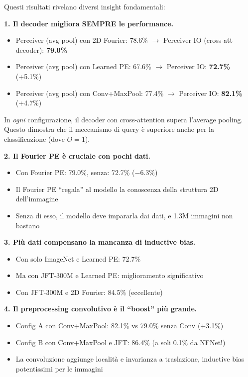 \documentclass[12pt,a4paper]{article}
\begin{document}
\begin{notabox}
Questi risultati rivelano diversi insight fondamentali:

\textbf{1. Il decoder migliora SEMPRE le performance.}
\begin{itemize}
    \item Perceiver (avg pool) con 2D Fourier: 78.6\% $\to$ Perceiver IO (cross-att decoder): \textbf{79.0\%}
    \item Perceiver (avg pool) con Learned PE: 67.6\% $\to$ Perceiver IO: \textbf{72.7\%} (+5.1\%)
    \item Perceiver (avg pool) con Conv+MaxPool: 77.4\% $\to$ Perceiver IO: \textbf{82.1\%} (+4.7\%)
\end{itemize}
In \emph{ogni} configurazione, il decoder con cross-attention supera l'average pooling. Questo dimostra che il meccanismo di query \`e superiore anche per la classificazione (dove $O = 1$).

\textbf{2. Il Fourier PE \`e cruciale con pochi dati.}
\begin{itemize}
    \item Con Fourier PE: 79.0\%, senza: 72.7\% ($-6.3\%$)
    \item Il Fourier PE ``regala'' al modello la conoscenza della struttura 2D dell'immagine
    \item Senza di esso, il modello deve impararla dai dati, e 1.3M immagini non bastano
\end{itemize}

\textbf{3. Pi\`u dati compensano la mancanza di inductive bias.}
\begin{itemize}
    \item Con solo ImageNet e Learned PE: 72.7\%
    \item Ma con JFT-300M e Learned PE: miglioramento significativo
    \item Con JFT-300M e 2D Fourier: 84.5\% (eccellente)
\end{itemize}

\textbf{4. Il preprocessing convolutivo \`e il ``boost'' pi\`u grande.}
\begin{itemize}
    \item Config A con Conv+MaxPool: 82.1\% vs 79.0\% senza Conv (+3.1\%)
    \item Config B con Conv+MaxPool e JFT: 86.4\% (a soli 0.1\% da NFNet!)
    \item La convoluzione aggiunge localit\`a e invarianza a traslazione, inductive bias potentissimi per le immagini
\end{itemize}
\end{notabox}
\end{document}
